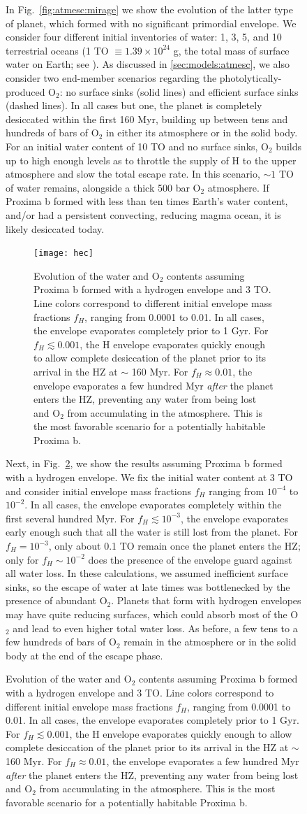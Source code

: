 \documentclass[preprint,12pt]{aastex}
\begin{document}
\begin{figure}
In Fig.~\ref{fig:atmesc:mirage} we show the evolution of the latter
type of planet, which formed with no significant primordial
envelope. We consider four different initial inventories of water: 1,
3, 5, and 10 terrestrial oceans (1 TO $\equiv 1.39\times 10^{24}$ g,
the total mass of surface water on Earth; see \cite{Kasting88}). As
discussed in \ref{sec:models:atmesc}, we also consider two end-member
scenarios regarding the photolytically-produced O$_2$: no surface
sinks (solid lines) and efficient surface sinks (dashed lines). In all
cases but one, the planet is completely desiccated within the first
160 Myr, building up between tens and hundreds of bars of O$_2$ in
either its atmosphere or in the solid body. For an initial water
content of 10 TO and no surface sinks, O$_2$ builds up to high enough
levels as to throttle the supply of H to the upper atmosphere and slow
the total escape rate. In this scenario, $\sim 1$ TO of water remains,
alongside a thick 500 bar O$_2$ atmosphere. If Proxima b formed with
less than ten times Earth's water content, and/or had a persistent
convecting, reducing magma ocean, it is likely desiccated today.

\begin{figure}[ht]
\centering
\texttt{[image: hec]}
\caption{Evolution of the water and O$_2$ contents assuming Proxima b
  formed with a hydrogen envelope and 3 TO. Line colors correspond to
  different initial envelope mass fractions $f_H$, ranging from 0.0001
  to 0.01. In all cases, the envelope evaporates completely prior to 1
  Gyr. For $f_H \lesssim 0.001$, the H envelope evaporates quickly
  enough to allow complete desiccation of the planet prior to its
  arrival in the HZ at $\sim$ 160 Myr. For $f_H \approx 0.01$, the
  envelope evaporates a few hundred Myr \emph{after} the planet enters
  the HZ, preventing any water from being lost and O$_2$ from
  accumulating in the atmosphere.  This is the most favorable scenario
  for a potentially habitable Proxima b.}
\label{fig:atmesc:hec}
\end{figure}

Next, in Fig.~\ref{fig:atmesc:hec}, we show the results assuming
Proxima b formed with a hydrogen envelope. We fix the initial water
content at 3 TO and consider initial envelope mass fractions $f_H$
ranging from $10^{-4}$ to $10^{-2}$. In all cases, the envelope
evaporates completely within the first several hundred Myr. For $f_H
\lesssim 10^{-3}$, the envelope evaporates early enough such that all
the water is still lost from the planet. For $f_H = 10^{-3}$, only
about 0.1 TO remain once the planet enters the HZ; only for $f_H \sim
10^{-2}$ does the presence of the envelope guard against all water
loss. In these calculations, we assumed inefficient surface sinks, so
the escape of water at late times was bottlenecked by the presence of
abundant O$_2$. Planets that form with hydrogen envelopes may have
quite reducing surfaces, which could absorb most of the O$_2$ and lead
to even higher total water loss. As before, a few tens to a few
hundreds of bars of O$_2$ remain in the atmosphere or in the solid
body at the end of the escape phase.


\end{figure}
\end{document}
